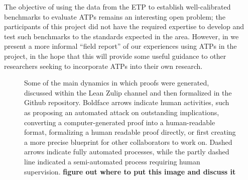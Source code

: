The objective of using the data from the ETP to establish well-calibrated benchmarks to evaluate ATPs remains an interesting open problem; the participants of this project did not have the required expertise to develop and test such benchmarks to the standards expected in the area.  However, in  we present a more informal ``field report'' of our experiences using ATPs in the project, in the hope that this will provide some useful guidance to other researchers seeking to incorporate ATPs into their own research.

\begin{figure}
\centering
{}
\caption{Some of the main dynamics in which proofs were generated, discussed within the Lean Zulip channel and then formalized in the Github repository.  Boldface arrows indicate human activities, such as proposing an automated attack on outstanding implications, converting a computer-generated proof into a human-readable format, formalizing a human readable proof directly, or first creating a more precise blueprint for other collaborators to work on.  Dashed arrows indicate fully automated processes, while the partly dashed line indicated a semi-automated process requiring human supervision. {\bf figure out where to put this image and discuss it}}
\label{fig:flow}
\end{figure}

